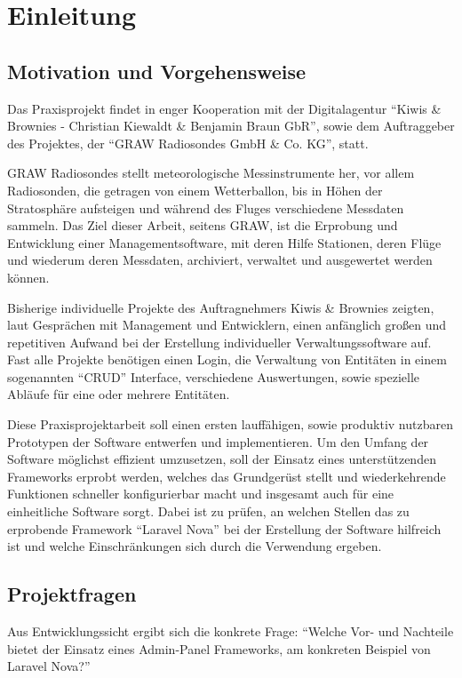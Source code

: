 \section{Einleitung}

\subsection{Motivation und Vorgehensweise}
Das Praxisprojekt findet in enger Kooperation mit der Digitalagentur \enquote{Kiwis \& Brownies - Christian Kiewaldt \& Benjamin Braun GbR}\cite{kiwis}, sowie dem Auftraggeber des Projektes, der \enquote{GRAW Radiosondes GmbH \& Co. KG}\cite{graw}, statt.

GRAW Radiosondes stellt meteorologische Messinstrumente her, vor allem Radiosonden, die getragen von einem Wetterballon, bis in Höhen der Stratosphäre aufsteigen und während des Fluges verschiedene Messdaten sammeln.
Das Ziel dieser Arbeit, seitens GRAW, ist die Erprobung und Entwicklung einer Managementsoftware, mit deren Hilfe Stationen, deren Flüge und wiederum deren Messdaten, archiviert, verwaltet und ausgewertet werden können.

Bisherige individuelle Projekte des Auftragnehmers Kiwis \& Brownies zeigten, laut Gesprächen mit Management und Entwicklern, einen anfänglich großen und repetitiven Aufwand bei der Erstellung individueller Verwaltungssoftware auf.
Fast alle Projekte benötigen einen Login, die Verwaltung von Entitäten in einem sogenannten \enquote{CRUD}\cite{crud} Interface, verschiedene Auswertungen, sowie spezielle Abläufe für eine oder mehrere Entitäten.

Diese Praxisprojektarbeit soll einen ersten lauffähigen, sowie produktiv nutzbaren Prototypen der Software entwerfen und implementieren.
Um den Umfang der Software möglichst effizient umzusetzen, soll der Einsatz eines unterstützenden Frameworks erprobt werden, welches das Grundgerüst stellt und wiederkehrende Funktionen schneller konfigurierbar macht und insgesamt auch für eine einheitliche Software sorgt.
Dabei ist zu prüfen, an welchen Stellen das zu erprobende Framework \enquote{Laravel Nova}\cite{laravel-nova} bei der Erstellung der Software hilfreich ist und welche Einschränkungen sich durch die Verwendung ergeben.
\newpage

\subsection{Projektfragen}
Aus Entwicklungssicht ergibt sich die konkrete Frage:
\enquote{Welche Vor- und Nachteile bietet der Einsatz eines Admin-Panel Frameworks, am konkreten Beispiel von Laravel Nova?}


